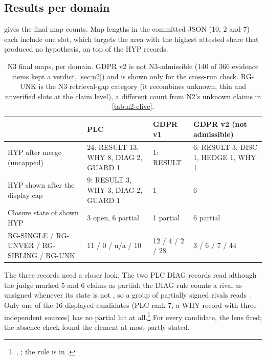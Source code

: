 \subsection{Results per domain}

 gives the final map counts. Map lengths in the committed JSON (10, 2 and 7)
each include one  slot, which targets the area with the highest attested share that
produced no hypothesis, on top of the HYP records.

\begin{table}[tbp]
  \centering
  \small
  \caption{N3 final maps, per domain. GDPR v2 is not N3-admissible (140 of 366 evidence items kept a
   verdict, \cref{sec:n2}) and is shown only for the cross-run check. RG-UNK is the N3
  retrieval-gap category (it recombines unknown, thin and unverified slots at the claim level), a
  different count from N2's unknown claims in \cref{tab:n2-elive}.}
  \label{tab:n3-results}
  \begin{tabularx}{\linewidth}{@{}p{3.3cm}XXX@{}}
    \toprule
    & PLC & GDPR v1 & GDPR v2 (not admissible) \\
    \midrule
    HYP after merge (uncapped) & 24: RESULT 13, WHY 8, DIAG 2, GUARD 1 & 1: RESULT &
      6: RESULT 3, DISC 1, HEDGE 1, WHY 1 \\
    HYP shown after the display cap & 9: RESULT 3, WHY 3, DIAG 2, GUARD 1 & 1 & 6 \\
    Closure state of shown HYP & 3 open, 6 partial & 1 partial & 6 partial \\
    RG-SINGLE / RG-UNVER / RG-SIBLING / RG-UNK & 11 / 0 / n/a / 10 & 12 / 4 / 2 / 28 &
      3 / 6 / 7 / 44 \\
    \bottomrule
  \end{tabularx}
\end{table}

\evobs{} The three  records need a closer look. The two PLC DIAG records read
 although the judge marked 5 and 6 claims as partial: the DIAG rule counts a rival as
unsigned whenever its state is not , so a group of partially signed rivals reads
. Only one of the 16 displayed candidates (PLC rank 7, a WHY record with three independent
sources) has no partial hit at all.\footnote{,
; the rule is in .} For every
candidate, the lens fired; the absence check found the element at most partly stated.

